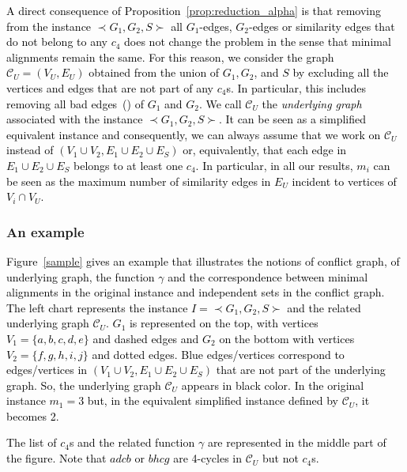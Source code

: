 \documentclass[final]{dmtcs-episciences}
\newcommand\mar[1]{\textcolor{black}{#1}}
\begin{document}
\mar{A direct consequence of Proposition~\ref{prop:reduction_alpha} is that removing from the instance  $\prec G_1,G_2,S \succ$ all $G_1$-edges, $G_2$-edges or similarity edges that do not belong to any $c_4$ does not change the problem in the sense that minimal alignments remain the same. For this reason, we  
 consider the graph $\mathcal{C}_U=(V_U,E_U)$ 
obtained from the union of $G_1, G_2$, and $S$ by excluding all the vertices and edges that are not part of 
any $c_4$s. In particular, this includes removing all bad edges~(\citet{Fertin200990}) of $G_1$ and $G_2$. We call $\mathcal{C}_U$ the {\em underlying graph} associated with the instance $\prec G_1,G_2,S \succ$.  It can be seen  as a simplified equivalent instance and consequently, we can always assume that we work on $\mathcal{C}_U$ instead of $(V_1\cup V_2, E_1\cup E_2\cup E_S)$ or, equivalently, that each edge in $E_1\cup E_2\cup E_S$ belongs to at least one $c_4$. In particular, in all our results, $m_i$ can be seen as the maximum number of similarity edges in $E_U$ incident to vertices of $V_i\cap V_U$.}   

\subsubsection{An example}\label{subsub:figure}

\mar{Figure~\ref{sample} gives an example that illustrates the notions of conflict graph, of underlying graph, the function $\gamma$ and the correspondence between minimal alignments in the original instance and independent sets in the conflict graph.  The left chart represents the instance $I=\prec G_1, G_2,S \succ$ and the related underlying graph $\mathcal{C}_U$. $G_1$ is represented on the top, with vertices $V_1=\{a,b,c,d,e\}$ and dashed edges and $G_2$ on the bottom  with vertices $V_2=\{f,g,h,i,j\}$ and dotted edges.  Blue edges/vertices correspond to edges/vertices in $(V_1\cup V_2, E_1\cup E_2\cup E_S)$ that are not part of the underlying graph. So, the underlying graph $\mathcal{C}_U$ appears in black color. In the original instance $m_1=3$ but, in the equivalent simplified instance defined by $\mathcal{C}_U$, it becomes 2.}

\mar{The list of $c_4$s and the related function $\gamma$
are represented in the middle part of the figure.
Note that $adcb$ or $bhcg$ are 4-cycles in $\mathcal{C}_U$ but not $c_4$s. }
\end{document}
